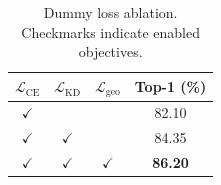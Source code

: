 \begin{table}[t]
    \centering
    \caption{Dummy loss ablation. Checkmarks indicate enabled objectives.}
    \label{tab:ablation}
    \begin{tabular}{ccc c}
        \toprule
        $\mathcal{L}_{\mathrm{CE}}$ & $\mathcal{L}_{\mathrm{KD}}$ &
        $\mathcal{L}_{\mathrm{geo}}$ & Top-1 (\%) \\
        \midrule
        $\checkmark$ &              &              & 82.10 \\
        $\checkmark$ & $\checkmark$ &              & 84.35 \\
        $\checkmark$ & $\checkmark$ & $\checkmark$ & \textbf{86.20} \\
        \bottomrule
    \end{tabular}
\end{table}
